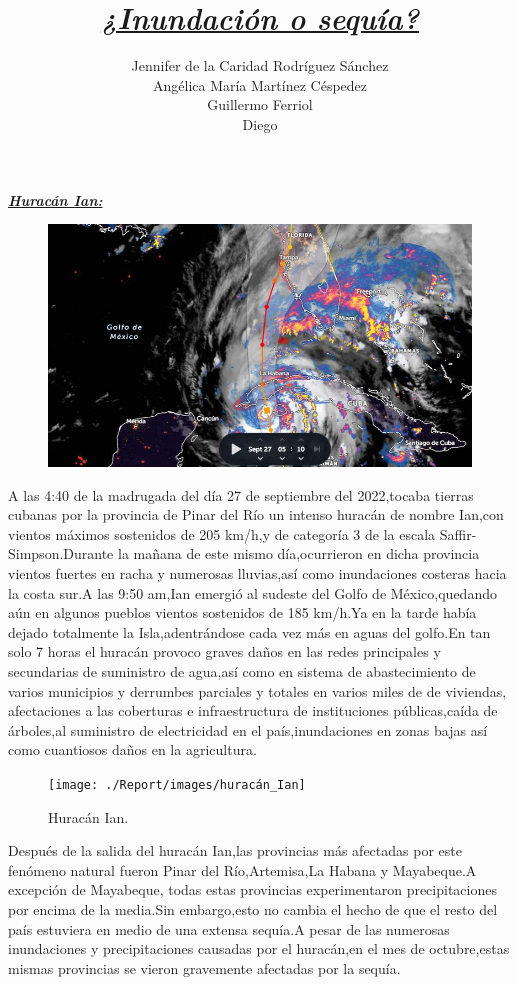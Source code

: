 \documentclass[12pt]{article}
\title{\textbf{\textit{\underline{¿Inundación o sequía?}}}}
\author{Jennifer de la Caridad Rodríguez Sánchez\\
        Angélica María Martínez Céspedez\\
        Guillermo Ferriol\\
        Diego\\}
\begin{document}
\begin{center}
	\textbf{\textit{\underline{{\fontsize{60}{24}\selectfont Huracán Ian:}}}}
\end{center}


\begin{figure}[H]
	\centering
	\includegraphics[width=0.7\linewidth]{./Report/images/Ian}
	\label{fig:ian}
\end{figure}

 
A las 4:40 de la madrugada del día 27 de septiembre del 2022,tocaba tierras cubanas por la provincia de Pinar del Río un intenso huracán de nombre Ian,con vientos máximos sostenidos de 205 km/h,y de categoría 3 de la escala Saffir-Simpson.Durante la mañana de este mismo día,ocurrieron en dicha provincia vientos fuertes en racha y numerosas lluvias,así como inundaciones costeras hacia la costa sur.A las 9:50 am,Ian emergió al sudeste del Golfo de México,quedando aún en algunos pueblos vientos sostenidos de 185 km/h.Ya en la tarde había dejado totalmente la Isla,adentrándose cada vez más en aguas del golfo.En tan solo 7 horas el huracán provoco graves daños en las redes principales y secundarias de suministro de agua,así como en sistema de abastecimiento de varios municipios y derrumbes parciales y totales en varios miles de de viviendas, afectaciones a las coberturas e infraestructura de instituciones públicas,caída de árboles,al suministro de electricidad en el país,inundaciones en zonas bajas así como cuantiosos daños en la agricultura.\cite{webpage1}


\begin{figure}[H]
	\centering
	\texttt{[image: ./Report/images/huracán\_Ian]}
	\caption{Huracán Ian.}
	\label{fig:huracanian}
\end{figure}


Después de la salida del huracán Ian,las provincias más afectadas por este fenómeno natural fueron Pinar del Río,Artemisa,La Habana y Mayabeque.A excepción de Mayabeque, todas estas provincias experimentaron precipitaciones por encima de la media.Sin embargo,esto no cambia el hecho de que el resto del país estuviera en medio de una extensa sequía.A pesar de las numerosas inundaciones y precipitaciones causadas por el huracán,en el mes de octubre,estas mismas provincias se vieron gravemente afectadas por la sequía.\cite{webpage2}
\end{document}
